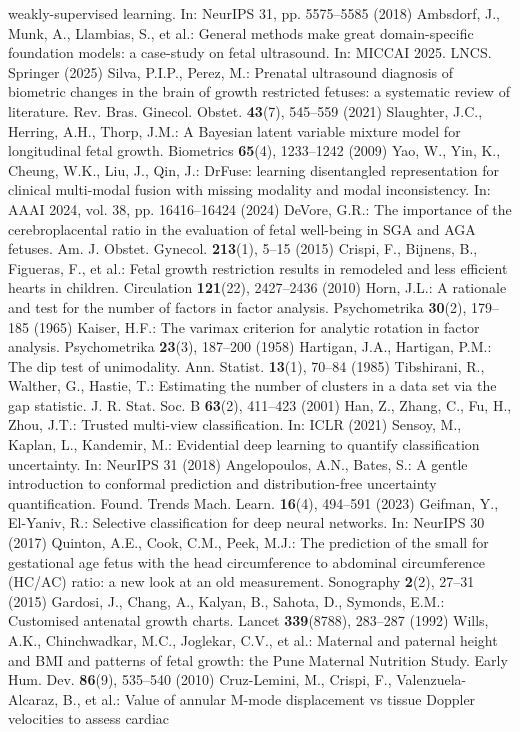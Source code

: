 \documentclass[a4paper,fleqn]{cas-sc}
\begin{document}
weakly-supervised learning. In: NeurIPS 31, pp. 5575--5585 (2018)  Ambsdorf, J., Munk, A., Llambias, S., et al.: General methods make great domain-specific foundation models: a case-study on fetal ultrasound. In: MICCAI 2025. LNCS. Springer (2025)  Silva, P.I.P., Perez, M.: Prenatal ultrasound diagnosis of biometric changes in the brain of growth restricted fetuses: a systematic review of literature. Rev. Bras. Ginecol. Obstet. \textbf{43}(7), 545--559 (2021)  Slaughter, J.C., Herring, A.H., Thorp, J.M.: A Bayesian latent variable mixture model for longitudinal fetal growth. Biometrics \textbf{65}(4), 1233--1242 (2009)  Yao, W., Yin, K., Cheung, W.K., Liu, J., Qin, J.: DrFuse: learning disentangled representation for clinical multi-modal fusion with missing modality and modal inconsistency. In: AAAI 2024, vol. 38, pp. 16416--16424 (2024)  DeVore, G.R.: The importance of the cerebroplacental ratio in the evaluation of fetal well-being in SGA and AGA fetuses. Am. J. Obstet. Gynecol. \textbf{213}(1), 5--15 (2015)  Crispi, F., Bijnens, B., Figueras, F., et al.: Fetal growth restriction results in remodeled and less efficient hearts in children. Circulation \textbf{121}(22), 2427--2436 (2010)  Horn, J.L.: A rationale and test for the number of factors in factor analysis. Psychometrika \textbf{30}(2), 179--185 (1965)  Kaiser, H.F.: The varimax criterion for analytic rotation in factor analysis. Psychometrika \textbf{23}(3), 187--200 (1958)  Hartigan, J.A., Hartigan, P.M.: The dip test of unimodality. Ann. Statist. \textbf{13}(1), 70--84 (1985)  Tibshirani, R., Walther, G., Hastie, T.: Estimating the number of clusters in a data set via the gap statistic. J. R. Stat. Soc. B \textbf{63}(2), 411--423 (2001)  Han, Z., Zhang, C., Fu, H., Zhou, J.T.: Trusted multi-view classification. In: ICLR (2021)  Sensoy, M., Kaplan, L., Kandemir, M.: Evidential deep learning to quantify classification uncertainty. In: NeurIPS 31 (2018)  Angelopoulos, A.N., Bates, S.: A gentle introduction to conformal prediction and distribution-free uncertainty quantification. Found. Trends Mach. Learn. \textbf{16}(4), 494--591 (2023)  Geifman, Y., El-Yaniv, R.: Selective classification for deep neural networks. In: NeurIPS 30 (2017)  Quinton, A.E., Cook, C.M., Peek, M.J.: The prediction of the small for gestational age fetus with the head circumference to abdominal circumference (HC/AC) ratio: a new look at an old measurement. Sonography \textbf{2}(2), 27--31 (2015)  Gardosi, J., Chang, A., Kalyan, B., Sahota, D., Symonds, E.M.: Customised antenatal growth charts. Lancet \textbf{339}(8788), 283--287 (1992)  Wills, A.K., Chinchwadkar, M.C., Joglekar, C.V., et al.: Maternal and paternal height and BMI and patterns of fetal growth: the Pune Maternal Nutrition Study. Early Hum. Dev. \textbf{86}(9), 535--540 (2010)  Cruz-Lemini, M., Crispi, F., Valenzuela-Alcaraz, B., et al.: Value of annular M-mode displacement vs tissue Doppler velocities to assess cardiac 
\end{document}
